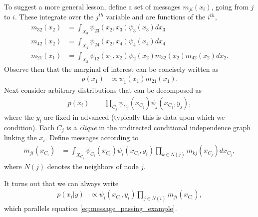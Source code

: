 To suggest a more general lesson, define a set of messages
$m_{ji}\left(x_i\right)$, going from $j$ to $i$. These integrate over the
$j^{th}$ variable and are functions of the $i^{th}$,
\begin{align*}
  m_{32}\left(x_2\right) &= \int_{X_3} \psi_{23}\left(x_2, x_3\right)\psi_3\left(x_3\right) dx_3 \\
  m_{42}\left(x_2\right) &= \int_{X_4} \psi_{24}\left(x_2, x_4\right)\psi_4\left(x_4\right) dx_4 \\
  m_{21}\left(x_1\right) &= \int_{X_2} \psi_{12}\left(x_1, x_2\right) \psi_2\left(x_2\right) m_{32}\left(x_2\right) m_{42}\left(x_2\right) dx_2.
\end{align*}
Observe then that the marginal of interest can be concisely written as
\begin{align}
  \label{eq:message_passing_example}
  p\left(x_1\right) &\propto \psi_1\left(x_1\right) m_{21}\left(x_1\right).
\end{align}
Next consider arbitrary distributions that can be decomposed as
\begin{align*}
  p\left(x_i\right) &= \prod_{C_j} \psi_{C_j}\left(x_{C_j}\right)\psi_{j}\left(x_{C_j}, y_{j}\right),
\end{align*}
where the $y_i$ are fixed in advanced (typically this is data upon which we
condition). Each $C_j$ is a \textit{clique} in the undirected conditional
independence graph linking the $x_i$. Define messages according to
\begin{align*}
  m_{ji}\left(x_{C_i}\right) &= \int_{X_{C_{j}}} \psi_{C_i}\left(x_{C_{i}}\right) \psi_{i}\left(x_{C_{i}}, y_{i}\right) \prod_{k \in N\left(j\right)} m_{kj}\left(x_{C_{j}}\right) dx_{C_{j}},
\end{align*}
where $N\left(j\right)$ denotes the neighbors of node $j$.

It turns out that we can always write
\begin{align}
  \label{eq:message_update}
  p\left(x_{i} \vert y\right) &\propto \psi_{i}\left(x_{C_i}, y_i\right) \prod_{j \in N\left(i\right)} m_{ji}\left(x_{C_i}\right),
\end{align}
which parallels equation \ref{eq:message_passing_example}.

